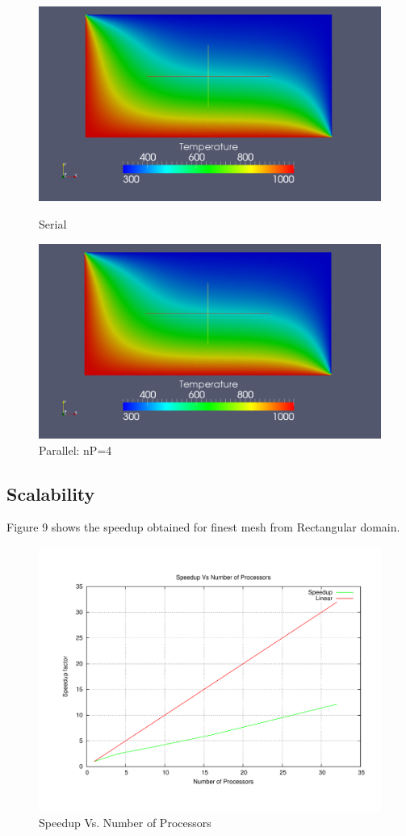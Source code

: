 \documentclass[a4paper, 11pt, oneside]{scrartcl}
\begin{document}
\begin{figure}[!htb]
\centering
{}
\centering
\includegraphics[scale=0.2]{./serial.png}
\caption{Serial}
\endminipage\hfill
\centering
{}
\centering
\includegraphics[scale=.2]{./parallel.png}
\caption{Parallel: nP=4}
\endminipage\hfill

\end{figure}
\subsection{Scalability}
Figure 9 shows the speedup obtained for finest mesh from Rectangular domain.
\begin{figure}[!htb]
\centering
\includegraphics[scale=0.6]{./Timings.pdf}
\caption{Speedup Vs. Number of Processors}
\end{figure}
\end{document}
